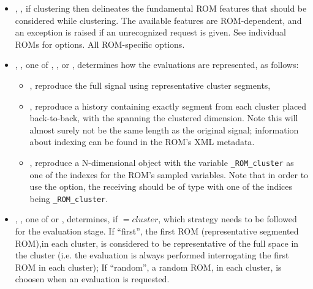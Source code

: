 {\begin{itemize}
        defined in the  block to this segmentation. If clustering is enabled (see
         above), then this associated Classifier will be used to cluster the segmented ROM
        subspaces. The attributes = and
        = must be set, and the text of this node is the 
        of the requested Classifier. Note this Classifier must be a valid Classifier; not all PostProcessors
        are suitable. For example, see the DataMining PostProcessor subtype Clustering.
      \item {}, , if clustering then delineates
        the fundamental ROM features that should be considered while clustering. The available features are
        ROM-dependent, and an exception is raised if an unrecognized request is given. See individual ROMs
        for options.  All ROM-specific options.
      \item {}, , one of ,
        , or , determines how the evaluations are
        represented, as follows:
        \begin{itemize}
          \item {}, reproduce the full signal using representative cluster segments,
          \item {}, reproduce a history containing exactly segment from each
            cluster placed back-to-back, with the  spanning the clustered
            dimension. Note this will almost surely not be the same length as the original signal;
            information about indexing can be found in the ROM's XML metadata.
          \item {}, reproduce a N-dimensional object with the variable
            \texttt{\_ROM\_cluster} as one of the indexes for the ROM's sampled variables. Note that
            in order to use the option, the receiving  should be of type
             with one of the indices being \texttt{\_ROM\_cluster}.
        \end{itemize}
     \item {}, , one of  or
        , determines, if $=cluster$, which 
        strategy needs to be followed for the evaluation stage. If ``first'', the 
        first ROM (representative segmented ROM),in each cluster, is considered to
         be representative of the full space in the cluster (i.e. the evaluation is always performed
         interrogating the first ROM in each cluster); If ``random'', a random ROM, in each cluster, 
         is choosen when an evaluation is requested.
    \end{itemize}
}

